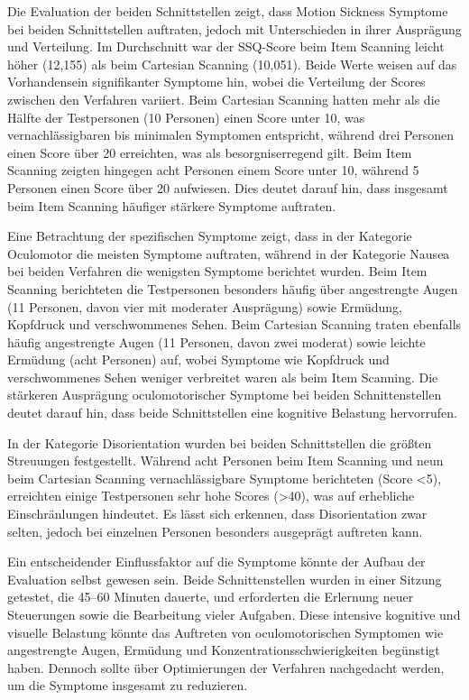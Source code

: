 Die Evaluation der beiden Schnittstellen zeigt, dass Motion Sickness Symptome bei beiden Schnittstellen auftraten, jedoch mit Unterschieden in ihrer Ausprägung und Verteilung. Im Durchschnitt war der SSQ-Score beim Item Scanning leicht höher (12,155) als beim Cartesian Scanning (10,051). Beide Werte weisen auf das Vorhandensein signifikanter Symptome hin, wobei die Verteilung der Scores zwischen den Verfahren variiert. Beim Cartesian Scanning hatten mehr als die Hälfte der Testpersonen (10 Personen) einen Score unter 10, was vernachlässigbaren bis minimalen Symptomen entspricht, während drei Personen einen Score über 20 erreichten, was als besorgniserregend gilt. Beim Item Scanning zeigten hingegen acht Personen einem Score unter 10, während 5 Personen einen Score über 20 aufwiesen. Dies deutet darauf hin, dass insgesamt beim Item Scanning häufiger stärkere Symptome auftraten.

Eine Betrachtung der spezifischen Symptome zeigt, dass in der Kategorie Oculomotor die meisten Symptome auftraten, während in der Kategorie Nausea bei beiden Verfahren die wenigsten Symptome berichtet wurden. Beim Item Scanning berichteten die Testpersonen besonders häufig über angestrengte Augen (11 Personen, davon vier mit moderater Ausprägung) sowie Ermüdung, Kopfdruck und verschwommenes Sehen. Beim Cartesian Scanning traten ebenfalls häufig angestrengte Augen (11 Personen, davon zwei moderat) sowie leichte Ermüdung (acht Personen) auf, wobei Symptome wie Kopfdruck und verschwommenes Sehen weniger verbreitet waren als beim Item Scanning. Die stärkeren Ausprägung oculomotorischer Symptome bei beiden Schnittenstellen deutet darauf hin, dass beide Schnittstellen eine kognitive Belastung hervorrufen. 

In der Kategorie Disorientation wurden bei beiden Schnittstellen die größten Streuungen festgestellt. Während acht Personen beim Item Scanning und neun beim Cartesian Scanning vernachlässigbare Symptome berichteten (Score <5), erreichten einige Testpersonen sehr hohe Scores (>40), was auf erhebliche Einschränlungen hindeutet. Es lässt sich erkennen, dass Disorientation zwar selten, jedoch bei einzelnen Personen besonders ausgeprägt auftreten kann.

Ein entscheidender Einflussfaktor auf die Symptome könnte der Aufbau der Evaluation selbst gewesen sein. Beide Schnittenstellen wurden in einer Sitzung getestet, die 45–60 Minuten dauerte, und erforderten die Erlernung neuer Steuerungen sowie die Bearbeitung vieler Aufgaben. Diese intensive kognitive und visuelle Belastung könnte das Auftreten von oculomotorischen Symptomen wie angestrengte Augen, Ermüdung und Konzentrationsschwierigkeiten begünstigt haben. Dennoch sollte über Optimierungen der Verfahren nachgedacht werden, um die Symptome insgesamt zu reduzieren.


